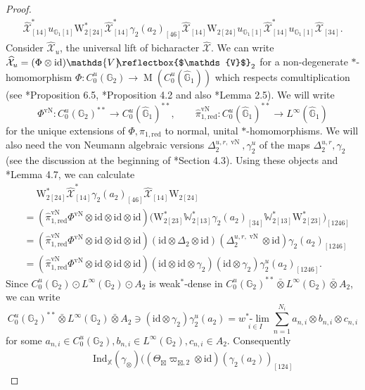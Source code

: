\documentclass[reqno]{amsart}
\numberwithin{equation}{section}
\newcommand{\id}{\mathrm{id}}
\newcommand{\G}{\mathbb{G}}
\newcommand{\X}{\mathbb{X}}
\newcommand{\Ind}{\mathrm{Ind}}
\newcommand{\red}{\mathrm{red}}
\newcommand{\oon}{\operatorname}
\newcommand{\mc}{\mathcal}
\newcommand{\wh}{\widehat}
\newcommand{\Mult}{\operatorname{M}}
\newcommand{\GG}{\mathbb{G}}
\newcommand{\ww}{\mathrm{W}}
\newcommand{\WW}{{\mathds{V}\!\!\text{\reflectbox{$\mathds{V}$}}}}
\newcommand{\Ww}{\mathds{W}}
\begin{document}
\begin{proof}
\begin{equation}
\begin{split}
\wh{\mc{X}}_{[14]}^*
u_{\G_1 [1]} \ww_{2[24]}^*
\wh{\mc{X}}_{[14]}^*
\gamma_2(a_2)_{[46]}
\wh{\mc{X}}_{[14]}
\ww_{2[24]}
u_{\G_1 [1]}
\wh{\mc{X}}_{[14]}^*
u_{\G_1 [1]}\wh{\mc{X}}_{[34]}.
\end{split}\end{equation}
Consider $\wh{\mc{X}}_u$, the universal lift of bicharacter $\wh{\mc{X}}$. We can write $\wh{\mc{X}}_u=(\Phi\otimes\id)\WW_2$ for a non-degenerate $*$-homomorphism $\Phi\colon C_0^u(\GG_2)\rightarrow \Mult(C_0^u(\hat{\GG}_1))$ which respects comultiplication (see \cite{Kus01}*{Proposition 6.5}, \cite{MRW12}*{Proposition 4.2} and also \cite{DCKr24}*{Lemma 2.5}). We will write 
\[
\Phi^{\oon{vN}}\colon C_0^u(\GG_2)^{**}\rightarrow C_0^u(\hat{\GG}_1)^{**},\qquad \hat{\pi}^{\oon{vN}}_{1,\red}\colon C_0^u(\hat{\GG}_1)^{**}\rightarrow L^{\infty}(\hat{\GG}_1)
\]
for the unique extensions of $\Phi,\hat{\pi}_{1,\red}$ to normal, unital $*$-homomorphisms. We will also need the von Neumann algebraic versions $\Delta^{u,r,\oon{vN}}_2,\gamma_2^u$ of the maps $\Delta^{u,r}_2,\gamma_2$ (see the discussion at the beginning of \cite{DCKr24}*{Section 4.3}). Using these objects and \cite{DCKr24}*{Lemma 4.7}, we can calculate
\[\begin{split}
&\quad\;
\ww_{2[24]}^*\wh{\mc{X}}_{[14]}^*
\gamma_2(a_2)_{[46]}\wh{\mc{X}}_{[14]}\ww_{2[24]}\\
&=
(\hat{\pi}_{1,\red}^{\oon{vN}}\Phi^{\oon{vN}}\otimes\id\otimes\id\otimes\id)
\bigl(
\ww^*_{2 [23]} \Ww^*_{2 [13]}\gamma_2(a_2)_{[34]}
\Ww^*_{2 [13]}\ww^*_{2 [23]}
\bigr)_{[1246]}\\
&=
(\hat{\pi}_{1,\red}^{\oon{vN}}\Phi^{\oon{vN}}\otimes\id\otimes\id\otimes\id)
(\id\otimes \Delta_2\otimes \id)
(\Delta_2^{u,r,\oon{vN}}\otimes\id)\gamma_2(a_2)_{[1246]}\\
&=
(\hat{\pi}_{1,\red}^{\oon{vN}}\Phi^{\oon{vN}}\otimes\id\otimes\id\otimes\id)
(\id\otimes \id\otimes \gamma_2)
(\id\otimes \gamma_2)\gamma_2^u(a_2)_{[1246]}.
\end{split}\]
Since $C_0^u(\GG_2)\odot L^{\infty}(\GG_2)\odot A_2$ is weak$^*$-dense in $
C_0^u(\GG_2)^{**}\bar\otimes L^{\infty}(\GG_2)\bar\otimes A_2$, we can write
\[
C_0^u(\GG_2)^{**}\bar\otimes L^{\infty}(\GG_2)\bar\otimes A_2\ni (\id\otimes\gamma_2)\gamma_2^u(a_2)=\underset{i\in I}{w^*\text{-}\lim}\sum_{n=1}^{N_i}a_{n,i}\otimes b_{n,i}\otimes c_{n,i}
\]
for some $a_{n,i}\in C_0^u(\GG_2), b_{n,i}\in L^{\infty}(\GG_2),c_{n,i}\in A_2$. Consequently
\[\begin{split}
&\quad\;
\Ind_{\X}(\gamma_\otimes )\bigl(
 (\Theta_{\boxtimes}\varpi_{\boxtimes,2}\otimes \id)(\gamma_2(a_2))_{[124]}

\end{split}\]
\end{proof}
\end{document}
